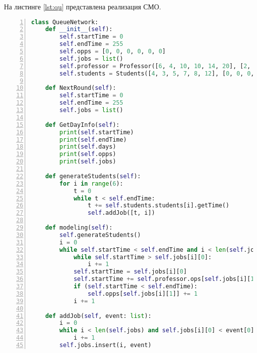На листинге \ref{lst:qu} представлена реализация СМО.
\begin{lstlisting}[language=Python,
	frame= tb,
	numbers=left,
	numberstyle=\footnotesize,
	caption={Реализация СМО},
	label={lst:qu}]
class QueueNetwork:
	def __init__(self):
		self.startTime = 0
		self.endTime = 255
		self.opps = [0, 0, 0, 0, 0, 0]
		self.jobs = list()
		self.professor = Professor([6, 4, 10, 10, 14, 20], [2, 1, 5, 3, 6, 8])
		self.students = Students([4, 3, 5, 7, 8, 12], [0, 0, 0, 0, 0, 0])

	def NextRound(self):
		self.startTime = 0
		self.endTime = 255
		self.jobs = list()

	def GetDayInfo(self):
		print(self.startTime)
		print(self.endTime)
		print(self.days)
		print(self.opps)
		print(self.jobs)

	def generateStudents(self):
		for i in range(6):
			t = 0
			while t < self.endTime:
				t += self.students.students[i].getTime()
				self.addJob([t, i])

	def modeling(self):
		self.generateStudents()
		i = 0
		while self.startTime < self.endTime and i < len(self.jobs):
			while self.startTime > self.jobs[i][0]:
				i += 1
			self.startTime = self.jobs[i][0]
			self.startTime += self.professor.ops[self.jobs[i][1]].getTime()
			if (self.startTime < self.endTime):
				self.opps[self.jobs[i][1]] += 1
			i += 1
			
	def addJob(self, event: list):
		i = 0
		while i < len(self.jobs) and self.jobs[i][0] < event[0]:
			i += 1
		self.jobs.insert(i, event)
\end{lstlisting}
